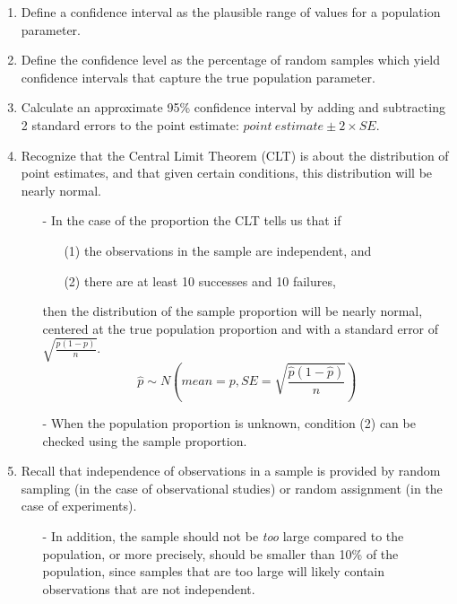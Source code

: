 \documentclass[11pt]{article}
\begin{document}
\begin{enumerate}[resume]
\renewcommand\labelenumi{\textcolor{light}{\textbf{LO \theenumi.}}}

\item Define a confidence interval as the plausible range of values for a population parameter.

\item Define the confidence level as the percentage of random samples which yield confidence intervals that capture the true population parameter.

\item Calculate an approximate 95\% confidence interval by adding and subtracting 2 standard errors to the point estimate: $point~estimate \pm 2 \times SE$.

\item Recognize that the Central Limit Theorem (CLT) is about the distribution of point estimates, and that given certain conditions, this distribution will be nearly normal.
\begin{itemize}
\item[-] In the case of the proportion the CLT tells us that if
\begin{itemize}[parsep=0pt]
\item[(1)] the observations in the sample are independent, and
\item[(2)] there are at least 10 successes and 10 failures,
\end{itemize}
then the distribution of the sample proportion will be nearly normal, centered at the true population proportion and with a standard error of $\sqrt{\frac{p(1-p)}{n}}$.
\[ \hat{p} \sim N \left( mean = p, SE = \sqrt{\frac{\hat{p}(1-\hat{p})}{n}} \right) \]
\item[-] When the population proportion is unknown, condition (2) can be checked using the sample proportion.
\end{itemize}

\item Recall that independence of observations in a sample is provided by random sampling (in the case of observational studies) or random assignment (in the case of experiments).
\begin{itemize}
\item[-] In addition, the sample should not be \textit{too} large compared to the population, or more precisely, should be smaller than 10\% of the population, since samples that are too large will likely contain observations that are not independent.
\end{itemize}


\end{enumerate}
\end{document}

